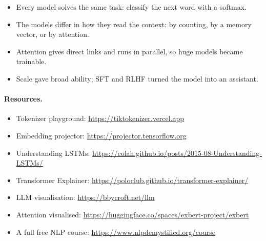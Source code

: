 \documentclass[12pt, a4paper]{article}
\begin{document}
\begin{itemize}
  \item Every model solves the same task: classify the next word with a
        softmax.
  \item The models differ in how they read the context: by counting, by a
        memory vector, or by attention.
  \item Attention gives direct links and runs in parallel, so huge models
        became trainable.
  \item Scale gave broad ability; SFT and RLHF turned the model into an
        assistant.
\end{itemize}

\paragraph{Resources.}
\begin{itemize}
  \item Tokenizer playground: \url{https://tiktokenizer.vercel.app}
  \item Embedding projector: \url{https://projector.tensorflow.org}
  \item Understanding LSTMs:\newline
        \url{https://colah.github.io/posts/2015-08-Understanding-LSTMs/}
  \item Transformer Explainer:
        \url{https://poloclub.github.io/transformer-explainer/}
  \item LLM visualisation: \url{https://bbycroft.net/llm}
  \item Attention visualised:
        \url{https://huggingface.co/spaces/exbert-project/exbert}
  \item A full free NLP course: \url{https://www.nlpdemystified.org/course}
\end{itemize}
\end{document}
